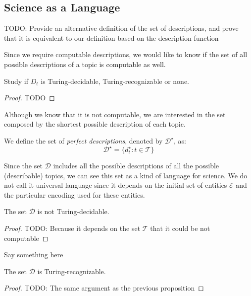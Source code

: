 \subsection{Science as a Language}

{\color{red} TODO: Provide an alternative definition of the set of descriptions, and prove that it is equivalent to our definition based on the description function}

Since we require computable descriptions, we would like to know if the set of all possible descriptions of a topic is computable as well.

\begin{proposition}
Study if $D_{t}$ is Turing-decidable, Turing-recognizable or none.
\end{proposition}
\begin{proof}
{\color{red} TODO}
\end{proof}

Although we know that it is not computable, we are interested in the set composed by the shortest possible description of each topic.

\begin{definition}
We define the set of \emph{perfect descriptions}, denoted by $\mathcal{D}^\star$, as:
\[
\mathcal{D}^\star = \{ d_t^\star : t \in \mathcal{T} \}
\]
\end{definition}

Since the set $\mathcal{D}$ includes all the possible descriptions of all the possible (describable) topics, we can see this set as a kind of language for science. We do not call it universal language since it depends on the initial set of entities $\mathcal{E}$ and the particular encoding used for these entities.

\begin{proposition}
The set $\mathcal{D}$ is not Turing-decidable.
\end{proposition}
\begin{proof}
{\color{red} TODO: Because it depends on the set $\mathcal{T}$ that it could be not computable}
\end{proof}

Say something here

\begin{proposition}
The set $\mathcal{D}$ is Turing-recognizable.
\end{proposition}
\begin{proof}
{\color{red} TODO: The same argument as the previous proposition}
\end{proof}


